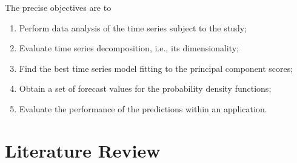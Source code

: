 \documentclass[
	12pt,				%
	oneside,			%
	a4paper,			%
	english,			%
	brazil				%
	]{abntex2ppgsi}
\begin{document}
The precise objectives are to
\begin{enumerate}
    \item Perform data analysis of the time series subject to the study;
    \item Evaluate time series decomposition, i.e., its dimensionality;
    \item Find the best time series model fitting to the principal component scores;
    \item Obtain a set of forecast values for the probability density functions;
    \item Evaluate the performance of the predictions within an application.
\end{enumerate}



\chapter{Literature Review}






    
    
    
\end{document}
